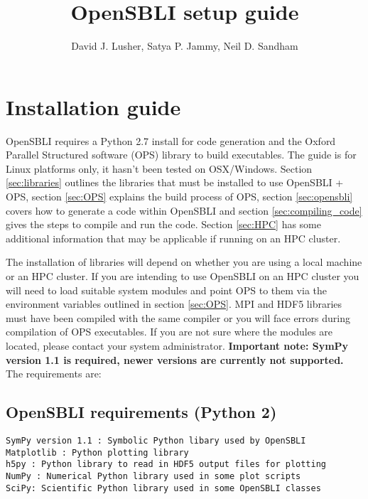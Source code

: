 \documentclass[11pt]{article}
\begin{document}
\title{OpenSBLI setup guide}
\author{David J. Lusher, Satya P. Jammy, Neil D. Sandham}


\maketitle
\section{Installation guide}\label{sec:installation_guide}
OpenSBLI requires a Python 2.7 install for code generation and the Oxford Parallel Structured software (OPS) library to build executables. The guide is for Linux platforms only, it hasn't been tested on OSX/Windows. Section \ref{sec:libraries} outlines the libraries that must be installed to use OpenSBLI + OPS, section \ref{sec:OPS} explains the build process of OPS, section \ref{sec:opensbli} covers how to generate a code within OpenSBLI and section \ref{sec:compiling_code} gives the steps to compile and run the code. Section \ref{sec:HPC} has some additional information that may be applicable if running on an HPC cluster.

The installation of libraries will depend on whether you are using a local machine or an HPC cluster. If you are intending to use OpenSBLI on an HPC cluster you will need to load suitable system modules and point OPS to them via the environment variables outlined in section \ref{sec:OPS}. MPI and HDF5 libraries must have been compiled with the same compiler or you will face errors during compilation of OPS executables. If you are not sure where the  modules are located, please contact your system administrator. \textbf{Important note: SymPy version 1.1 is required, newer versions are currently not supported.} The requirements are:
\subsection*{OpenSBLI requirements (Python 2)}
\begin{verbatim}
SymPy version 1.1 : Symbolic Python libary used by OpenSBLI
Matplotlib : Python plotting library
h5py : Python library to read in HDF5 output files for plotting
NumPy : Numerical Python library used in some plot scripts
SciPy: Scientific Python library used in some OpenSBLI classes
\end{verbatim}
\end{document}
